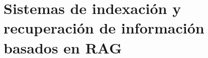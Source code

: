 \chapter{Sistemas de indexación y recuperación de información basados en RAG}
\label{cap:capitulo4}






